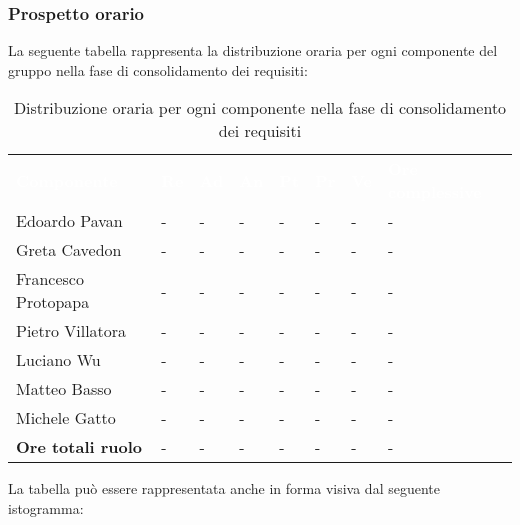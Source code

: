 \subsubsection{Prospetto orario}
La seguente tabella rappresenta la distribuzione oraria per ogni componente del gruppo nella fase di consolidamento dei requisiti:
\begin{table}[!htbp]
\begin{center}
\renewcommand{\arraystretch}{1.25}
\begin{tabular}{ m{}<{\centering}  m{}<{\centering} m{}<{\centering} m{}<{\centering}  m{}<{\centering}  m{}<{\centering}  m{}<{\centering}  m{}<{\centering}   }
	\rowcolor{darkblue}
	\textcolor{white}{\textbf{Componente}} &\textcolor{white}{\textbf{Re}}&\textcolor{white}{\textbf{Ad}}&\textcolor{white}{\textbf{An}}&\textcolor{white}{\textbf{Pt}}&\textcolor{white}{\textbf{Pr}}&\textcolor{white}{\textbf{Ve}}&\textcolor{white}{\textbf{Ore complessive}}\\ 

	Edoardo Pavan & - & - & - & - & - & - & -\\	

	Greta Cavedon & - & - & - & - & - & - & -\\
	
	Francesco Protopapa & - & - & - & - & - & - & -\\
	
	Pietro Villatora & - & - & - & - & - & - & -\\
	
	Luciano Wu & - & - & - & - & - & - & -\\
	
	Matteo Basso & - & - & - & - & - & - & -\\
	
	Michele Gatto & - & - & - & - & - & - & -\\
	
	\textbf{Ore totali ruolo} & - & - & - & - & - & - & -\\

\end{tabular}
\caption{Distribuzione oraria per ogni componente nella fase di consolidamento dei requisiti}
\end{center}
\end{table}

La tabella può essere rappresentata anche in forma visiva dal seguente istogramma:

